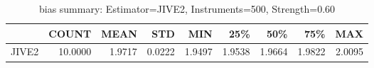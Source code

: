 \begin{table}[ht]
\centering
\caption{bias summary: Estimator=JIVE2, Instruments=500, Strength=0.60}
\begin{tabular}{lrrrrrrrr}
\toprule
 & COUNT & MEAN & STD & MIN & 25\% & 50\% & 75\% & MAX \\
\midrule
JIVE2 & 10.0000 & 1.9717 & 0.0222 & 1.9497 & 1.9538 & 1.9664 & 1.9822 & 2.0095 \\
\bottomrule
\end{tabular}
\end{table}
